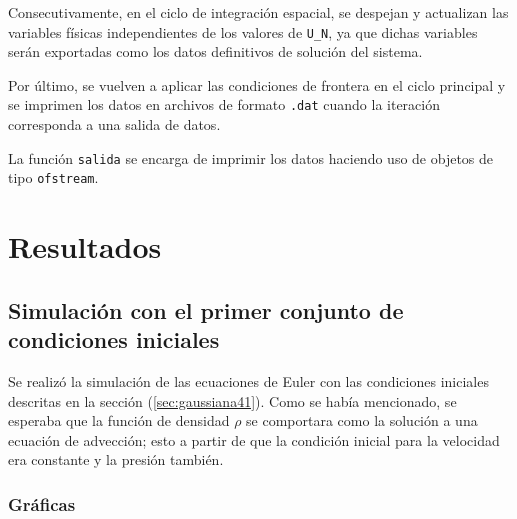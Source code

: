 Consecutivamente, en el ciclo de integración espacial, se despejan y actualizan las variables físicas independientes de los valores de \texttt{U\_N}, ya que dichas variables serán exportadas como los datos definitivos de solución del sistema.


Por último, se vuelven a aplicar las condiciones de frontera en el ciclo principal y se imprimen los datos en archivos de formato \texttt{.dat} cuando la iteración corresponda a una salida de datos.


La función \texttt{salida} se encarga de imprimir los datos haciendo uso de objetos de tipo \texttt{ofstream}.

\section{Resultados}
\subsection{Simulación con el primer conjunto de condiciones iniciales}
Se realizó la simulación de las ecuaciones de Euler con las condiciones iniciales descritas en la sección (\ref{sec:gaussiana41}). Como se había mencionado, se esperaba que la función de densidad $\rho$ se comportara como la solución a una ecuación de advección; esto a partir de que la condición inicial para la velocidad era constante y la presión también.

\subsubsection{Gráficas}

